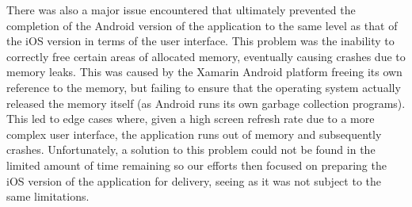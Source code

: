 \documentclass[main.tex]{subfiles}
\begin{document}
            There was also a major issue encountered that ultimately prevented the completion of the Android version of the application to the same level as that of the iOS version
            in terms of the user interface. This problem was the inability to correctly free certain areas of allocated memory, eventually causing crashes due to memory leaks. This was
            caused by the Xamarin Android platform freeing its own reference to the memory, but failing to ensure that the operating system actually released the memory itself
            (as Android runs its own garbage collection programs). This led to edge cases where, given a high screen refresh rate due to a more complex user interface, the application
            runs out of memory and subsequently crashes. Unfortunately, a solution to this problem could not be found in the limited amount of time remaining
            so our efforts then focused on preparing the iOS version of the application for delivery, seeing as it was not subject to the same limitations.
\end{document}
